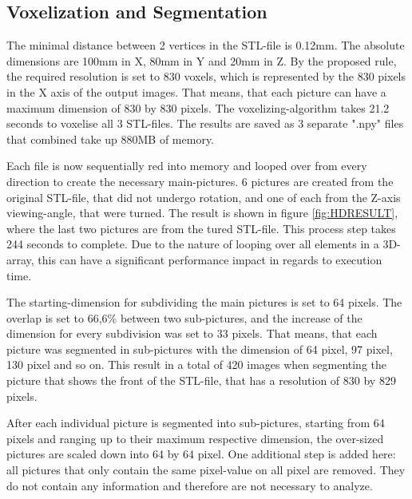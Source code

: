 \documentclass[conference]{IEEEtran}
\begin{document}
\subsection{Voxelization and Segmentation}
The minimal distance between 2 vertices in the STL-file is 0.12mm. The absolute dimensions are 100mm in X, 80mm in Y and 20mm in Z. By the proposed rule, the required resolution is set to 830 voxels, which is represented by the 830 pixels in the X axis of the output images. That means, that each picture can have a maximum dimension of 830 by 830 pixels.  The voxelizing-algorithm takes 21.2 seconds to voxelise all 3 STL-files. The results are saved as 3 separate ".npy" files that combined take up 880MB of memory. \newline

Each file is now sequentially red into memory and looped over from every direction to create the necessary main-pictures. 6 pictures are created from the original STL-file, that did not undergo rotation, and one of each from the Z-axis viewing-angle, that were turned. The result is shown in figure \ref{fig:HDRESULT}, where the last two pictures are from the tured STL-file. This process step takes 244 seconds to complete. Due to the nature of looping over all elements in a 3D-array, this can have a significant performance impact in regards to execution time.\newline

The starting-dimension for subdividing the main pictures is set to 64 pixels. The overlap is set to 66,6\% between two sub-pictures, and the increase of the dimension for every subdivision was set to 33 pixels. That means, that each picture was segmented in sub-pictures with the dimension of 64 pixel, 97 pixel, 130 pixel and so on. This result in a total of 420 images when segmenting the picture that shows the front of the STL-file, that has a resolution of 830 by 829 pixels.

After each individual picture is segmented into sub-pictures, starting from 64 pixels and ranging up to their maximum respective dimension, the over-sized pictures are scaled down into 64 by 64 pixel. One additional step is added here: all pictures that only contain the same pixel-value on all pixel are removed. They do not contain any information and therefore are not necessary to analyze.
\end{document}

